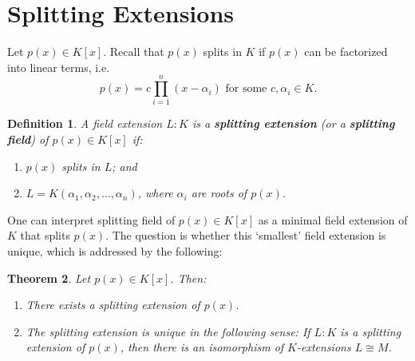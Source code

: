 \documentclass[11pt]{book}
\newtheorem{theorem}{Theorem}[section]
\newtheorem{definition}[theorem]{Definition}
\begin{document}
\section{Splitting Extensions} \label{sec-splitting}
Let $p(x) \in K[x]$. Recall that $p(x)$ splits in $K$ if $p(x)$ can be factorized into linear terms, i.e.
\[
p(x) = c \prod_{i=1}^n (x - \alpha_i) \text{ for some } c, \alpha_i \in K.
\]

\begin{definition}
A field extension $L:K$ is a \textbf{splitting extension} (or a \textbf{splitting field}) of $p(x) \in K[x]$ if:
\begin{enumerate}
    \item[(a)] $p(x)$ splits in $L$; and
    \item[(b)] $L = K(\alpha_1, \alpha_2, \ldots, \alpha_n)$, where $\alpha_i$ are roots of $p(x)$.
\end{enumerate}
\end{definition}


One can interpret splitting field of $p(x) \in K[x]$ as a minimal field extension of $K$ that splits $p(x)$. The question is whether this `smallest' field extension is unique, which is addressed by the following:
\begin{theorem}
Let $p(x) \in K[x]$. Then:
\begin{enumerate}
    \item[(a)] There exists a splitting extension of $p(x)$.
    \item[(b)] The splitting extension is unique in the following sense: If $L:K$ is a splitting extension of $p(x)$, then there is an isomorphism of $K$-extensions $L \cong M$.
\end{enumerate}
\end{theorem}
\end{document}
